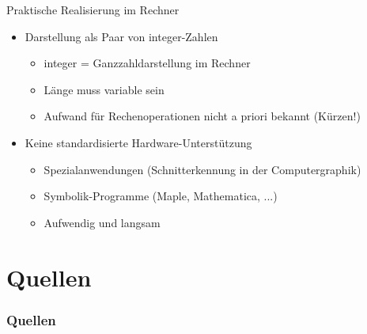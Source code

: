 \documentclass[12pt%
,aspectratio=169%
]{beamer}
\begin{document}
\begin{frame}{Praktische Realisierung im Rechner}
\begin{itemize}
	\item Darstellung als Paar von integer-Zahlen
	\begin{itemize}
		\item integer = Ganzzahldarstellung im Rechner
		\item Länge muss variable sein
		\item Aufwand für Rechenoperationen nicht a priori bekannt (Kürzen!)
	\end{itemize}
	\item Keine standardisierte Hardware-Unterstützung
	\begin{itemize}
		\item Spezialanwendungen (Schnitterkennung in der Computergraphik)
		\item Symbolik-Programme (Maple, Mathematica, ...)
		\item Aufwendig und langsam
	\end{itemize}
\end{itemize}
\end{frame}


\section*{Quellen}
\appendix
\begin{frame}[allowframebreaks]
  \frametitle<presentation>{Quellen}
\printbibliography
\end{frame}
\end{document}
